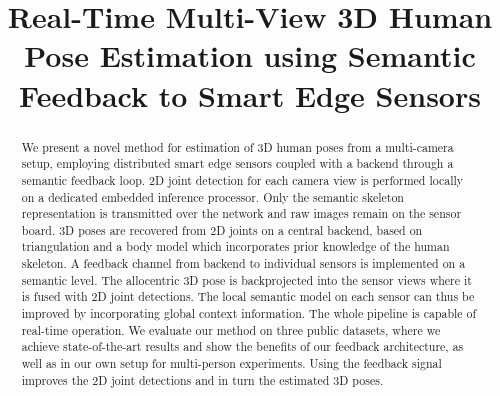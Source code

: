 \documentclass[conference]{IEEEtran}
\begin{document}
\title{Real-Time Multi-View 3D Human Pose Estimation using Semantic Feedback to Smart Edge Sensors}



\author{
\and
{}
}



\maketitle



\begin{abstract}
We present a novel method for estimation of 3D human poses from a multi-camera setup, employing distributed smart edge sensors coupled with a backend through a semantic feedback loop.
2D joint detection for each camera view is performed locally on a dedicated embedded inference processor.
Only the semantic skeleton representation is transmitted over the network and raw images remain on the sensor board.
3D poses are recovered from 2D joints on a central backend, based on triangulation and a body model which incorporates prior knowledge of the human skeleton.
A feedback channel from backend to individual sensors is implemented on a semantic level.
The allocentric 3D pose is backprojected into the sensor views where it is fused with 2D joint detections.
The local semantic model on each sensor can thus be improved by incorporating global context information.
The whole pipeline is capable of real-time operation.
We evaluate our method on three public datasets, where we achieve state-of-the-art results and show the benefits of our feedback architecture, as well as in our own setup for multi-person experiments. Using the feedback signal improves the 2D joint detections and in turn the estimated 3D poses.
\end{abstract}
\end{document}
